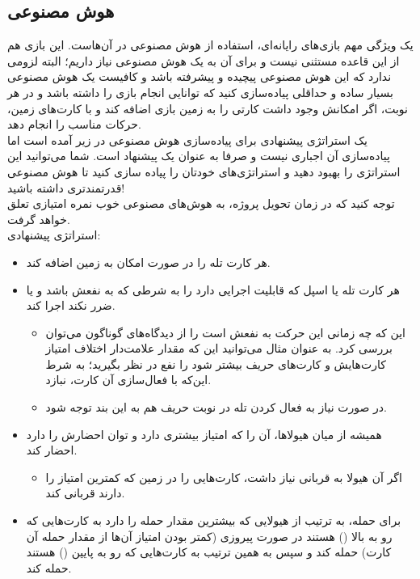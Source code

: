 \documentclass[]{article}
\begin{document}
\subsection*{{\titr هوش مصنوعی}}
یک ویژگی مهم بازی‌های رایانه‌ای، استفاده از هوش مصنوعی در آن‌هاست. این بازی هم 
از این قاعده مستثنی نیست و برای آن به یک هوش مصنوعی نیاز داریم؛ البته 
لزومی 
ندارد که این هوش مصنوعی پیچیده و پیشرفته باشد و کافیست یک هوش مصنوعی بسیار 
ساده و حداقلی پیاده‌سازی کنید که توانایی انجام بازی را داشته باشد و در هر 
نوبت، اگر امکانش وجود داشت کارتی را به زمین بازی اضافه کند و با کارت‌های 
زمین، حرکات مناسب را انجام دهد.
\\
یک استراتژی پیشنهادی برای پیاده‌سازی هوش مصنوعی در زیر آمده است اما 
پیاده‌سازی آن اجباری نیست و صرفا به عنوان یک پیشنهاد است. شما می‌توانید این 
استراتژی را بهبود دهید و استراتژی‌های خودتان را پیاده سازی کنید تا هوش 
مصنوعی قدرتمند‌تری داشته باشید! 
\\
توجه کنید که در زمان تحویل پروژه، به هوش‌های مصنوعی خوب نمره امتیازی تعلق 
خواهد گرفت.
\\
استراتژی پیشنهادی:
\begin{itemize}
	\item 
	هر کارت تله را در صورت امکان به زمین اضافه کند.
	
	\item
	هر کارت تله یا اسپل که قابلیت اجرایی دارد را به شرطی که به نفعش باشد و 
	یا ضرر نکند اجرا کند.
	\begin{itemize}
		\item این که چه زمانی این حرکت به نفعش است را از دیدگاه‌های گوناگون 
		می‌توان بررسی کرد. به عنوان مثال می‌توانید این که مقدار علامت‌دار اختلاف 
		امتیاز 
		کارت‌هایش و کارت‌های حریف بیشتر شود را نفع در نظر بگیرید؛ به شرط 
		این‌که با 
		فعال‌سازی آن کارت، نبازد.
		\item
		در صورت نیاز به فعال کردن تله در نوبت حریف هم به این بند توجه شود.
	\end{itemize}

	\item
	همیشه از میان هیولا‌ها، آن را که امتیاز بیشتری دارد و توان احضارش را دارد 
	احضار کند. 
	\begin{itemize}
		\item 
		اگر آن هیولا به قربانی نیاز داشت، کارت‌هایی را در زمین که کمترین 
		امتیاز را دارند قربانی کند.
	\end{itemize}
	
	\item
	برای حمله، به ترتیب از هیولایی که بیشترین مقدار حمله را دارد به کارت‌هایی 
	که رو به بالا () هستند در صورت پیروزی (کمتر بودن امتیاز 
	آن‌ها از 
	مقدار حمله آن کارت) حمله کند و سپس به همین ترتیب به کارت‌هایی که رو به 
	پایین 
	() هستند حمله کند.
\end{itemize}
\end{document}
